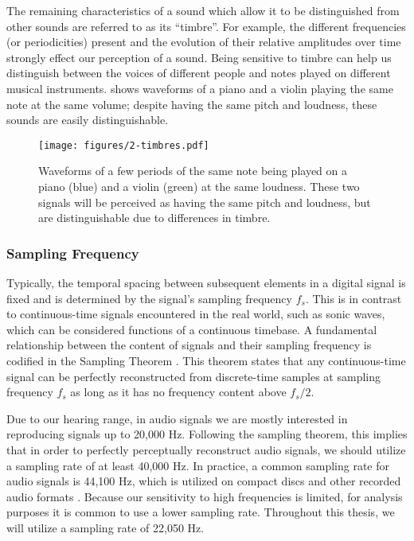 The remaining characteristics of a sound which allow it to be distinguished from other sounds are referred to as its ``timbre''.
For example, the different frequencies (or periodicities) present and the evolution of their relative amplitudes over time strongly effect our perception of a sound.
Being sensitive to timbre can help us distinguish between the voices of different people and notes played on different musical instruments.
 shows waveforms of a piano and a violin playing the same note at the same volume; despite having the same pitch and loudness, these sounds are easily distinguishable.

\begin{figure}
  \centering
  \texttt{[image: figures/2-timbres.pdf]}
  \caption[Waveforms of piano and violin]{Waveforms of a few periods of the same note being played on a piano (blue) and a violin (green) at the same loudness.
  These two signals will be perceived as having the same pitch and loudness, but are distinguishable due to differences in timbre.}
  \label{fig:timbres}
\end{figure}

\subsubsection{Sampling Frequency}

Typically, the temporal spacing between subsequent elements in a digital signal is fixed and is determined by the signal's sampling frequency $f_s$.
This is in contrast to continuous-time signals encountered in the real world, such as sonic waves, which can be considered functions of a continuous timebase.
A fundamental relationship between the content of signals and their sampling frequency is codified in the Sampling Theorem \cite{}.
This theorem states that any continuous-time signal can be perfectly reconstructed from discrete-time samples at sampling frequency $f_s$ as long as it has no frequency content above $f_s/2$.

Due to our hearing range, in audio signals we are mostly interested in reproducing signals up to 20,000 Hz.
Following the sampling theorem, this implies that in order to perfectly perceptually reconstruct audio signals, we should utilize a sampling rate of at least 40,000 Hz.
In practice, a common sampling rate for audio signals is 44,100 Hz, which is utilized on compact discs and other recorded audio formats \cite{}.
Because our sensitivity to high frequencies is limited, for analysis purposes it is common to use a lower sampling rate.
Throughout this thesis, we will utilize a sampling rate of 22,050 Hz.

